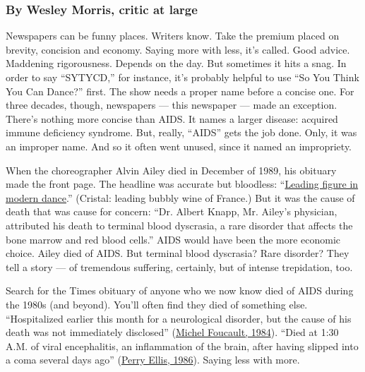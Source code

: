\hypertarget{by-wesley-morris-critic-at-large}{%
\subsubsection{By Wesley Morris, critic at
large}\label{by-wesley-morris-critic-at-large}}

Newspapers can be funny places. Writers know. Take the premium placed on
brevity, concision and economy. Saying more with less, it's called. Good
advice. Maddening rigorousness. Depends on the day. But sometimes it
hits a snag. In order to say ``SYTYCD,'' for instance, it's probably
helpful to use ``So You Think You Can Dance?'' first. The show needs a
proper name before a concise one. For three decades, though, newspapers
--- this newspaper --- made an exception. There's nothing more concise
than AIDS. It names a larger disease: acquired immune deficiency
syndrome. But, really, ``AIDS'' gets the job done. Only, it was an
improper name. And so it often went unused, since it named an
impropriety.

When the choreographer Alvin Ailey died in December of 1989, his
obituary made the front page. The headline was accurate but bloodless:
``\href{https://www.nytimes3xbfgragh.onion/1989/12/02/obituaries/alvin-ailey-a-leading-figure-in-modern-dance-dies-at-58.html}{Leading
figure in modern dance}.'' (Cristal: leading bubbly wine of France.) But
it was the cause of death that was cause for concern: ``Dr. Albert
Knapp, Mr. Ailey's physician, attributed his death to terminal blood
dyscrasia, a rare disorder that affects the bone marrow and red blood
cells.'' AIDS would have been the more economic choice. Ailey died of
AIDS. But terminal blood dyscrasia? Rare disorder? They tell a story ---
of tremendous suffering, certainly, but of intense trepidation, too.

Search for the Times obituary of anyone who we now know died of AIDS
during the 1980s (and beyond). You'll often find they died of something
else. ``Hospitalized earlier this month for a neurological disorder, but
the cause of his death was not immediately disclosed''
(\href{https://archive.nytimes3xbfgragh.onion/www.nytimes3xbfgragh.onion/books/00/12/17/specials/foucault-obit.html?_r=1}{Michel
Foucault, 1984}). ``Died at 1:30 A.M. of viral encephalitis, an
inflammation of the brain, after having slipped into a coma several days
ago''
(\href{https://www.nytimes3xbfgragh.onion/1986/05/31/obituaries/perry-ellis-fashion-designer-dead.html}{Perry
Ellis, 1986}). Saying less with more.

